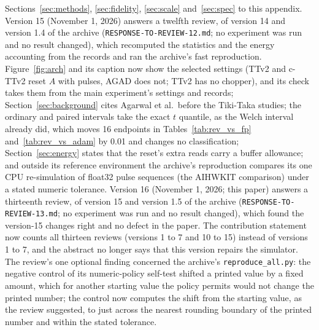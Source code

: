 Sections~\ref{sec:methods}, \ref{sec:fidelity}, \ref{sec:scale} and~\ref{sec:spec} to this appendix.
Version 15 (November 1, 2026) answers a twelfth review, of version 14 and version 1.4 of the archive
(\texttt{RESPONSE-TO-REVIEW-12.md}; no experiment was run and no result changed), which recomputed the statistics and the
energy accounting from the records and ran the archive's fast reproduction. Figure~\ref{fig:arch} and its caption now
show the selected settings (TTv2 and c-TTv2 reset $A$ with pulses, AGAD does not; TTv2 has no chopper), and its check takes
them from the main experiment's settings and records; Section~\ref{sec:background} cites Agarwal et al.\ before the
Tiki-Taka studies; the ordinary and paired intervals take the exact $t$ quantile, as the Welch interval already did, which
moves 16 endpoints in Tables~\ref{tab:rev_vs_fp} and~\ref{tab:rev_vs_adam} by 0.01 and changes no classification;
Section~\ref{sec:energy} states that the reset's extra reads carry a buffer allowance; and outside its reference
environment the archive's reproduction compares its one CPU re-simulation of float32 pulse sequences (the AIHWKIT
comparison) under a stated numeric tolerance.
Version 16 (November 1, 2026; this paper) answers a thirteenth review, of version 15 and version 1.5 of the archive
(\texttt{RESPONSE-TO-REVIEW-13.md}; no experiment was run and no result changed), which found the version-15 changes right
and no defect in the paper. The contribution statement now counts all thirteen reviews (versions 1 to 7 and 10 to 15)
instead of versions 1 to 7, and the abstract no longer says that this version repairs the simulator. The review's one optional finding concerned the archive's \texttt{reproduce\_all.py}: the
negative control of its numeric-policy self-test shifted a printed value by a fixed amount, which for another starting
value the policy permits would not change the printed number; the control now computes the shift from the starting value, as
the review suggested, to just across the nearest rounding boundary of the printed number and within the stated tolerance.

